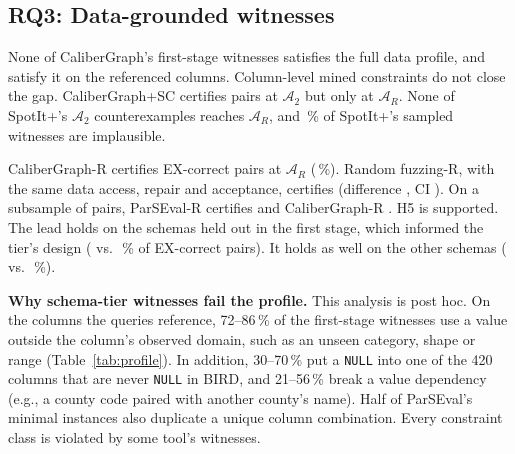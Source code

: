 \subsection{RQ3: Data-grounded witnesses}\label{sec:rresults}

\begin{table}[!htbp]
\centering\footnotesize
\caption{The data profile $\Pi$ mined from the eleven BIRD databases (75 tables, 3.9\,M rows, 258\,s on one core), and the post hoc share of first-stage $\mathcal A_{1f}$ witnesses that violate each constraint class on the columns either query references. Shares are over distinct EX-correct pairs. CG: CaliberGraph; PSE: ParSEval-L1.}\label{tab:profile}
\setlength{\tabcolsep}{2pt}\scriptsize
{}
\end{table}

None of CaliberGraph's  first-stage witnesses satisfies the full data profile, and  satisfy it on the referenced columns. Column-level mined constraints do not close the gap. CaliberGraph+SC certifies  pairs at $\mathcal A_2$ but only  at $\mathcal A_R$. None of SpotIt+'s  $\mathcal A_2$ counterexamples reaches $\mathcal A_R$, and \,\% of SpotIt+'s sampled witnesses are implausible.

CaliberGraph-R certifies  EX-correct pairs at $\mathcal A_R$ (\,\%). Random fuzzing-R, with the same data access, repair and acceptance, certifies  (difference , CI ). On a subsample of  pairs, ParSEval-R certifies  and CaliberGraph-R . H5 is supported. The lead holds on the schemas held out in the first stage, which informed the tier's design ( vs.\ \,\% of EX-correct pairs). It holds as well on the other schemas ( vs.\ \,\%).

\textbf{Why schema-tier witnesses fail the profile.} This analysis is post hoc. On the columns the queries reference, 72--86\,\% of the first-stage witnesses use a value outside the column's observed domain, such as an unseen category, shape or range (Table~\ref{tab:profile}). In addition, 30--70\,\% put a \texttt{NULL} into one of the 420 columns that are never \texttt{NULL} in BIRD, and 21--56\,\% break a value dependency (e.g., a county code paired with another county's name). Half of ParSEval's minimal instances also duplicate a unique column combination. Every constraint class is violated by some tool's witnesses.

